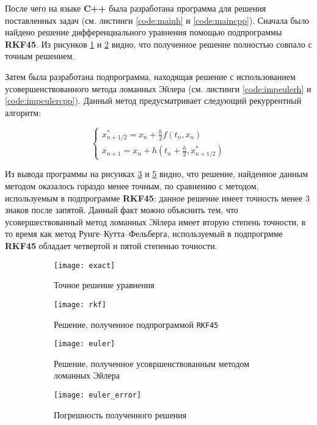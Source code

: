 \vspace{0.25cm}

После чего на языке \textbf{C++} была разработана программа для решения поставленных задач (см. листинги \ref{code:mainh} и \ref{code:maincpp}). Сначала было найдено решение дифференциального уравнения помощью подпрограммы \textbf{RKF45}. Из рисунков \ref{fig:exact} и \ref{fig:rkf} видно, что полученное решение полностью совпало с точным решением.

Затем была разработана подпрограмма, находящая решение с использованием усовершенствованного метода ломанных Эйлера (см. листинги \ref{code:impeulerh} и \ref{code:impeulercpp}). Данный метод предусматривает следующий рекуррентный алгоритм: 

\[
\begin{cases}
	x_{n+1/2}^{*} = x_n + \frac{h}{2} f(t_n, x_n)
	\\
	x_{n+1} = x_n + h \left(t_n + \frac{h}{2}, x_{n+1/2}^{*} \right)
\end{cases}
\]

Из вывода программы на рисунках \ref{fig:euler} и \ref{fig:euler_error} видно, что решение, найденное данным методом оказалось гораздо менее точным, по сравнению с методом, используемым в подпрограмме \textbf{RKF45}: данное решение имеет точность менее 3 знаков после запятой. Данный факт можно объяснить тем, что усовершествованный метод ломанных Эйлера имеет вторую степень точности, в то время как метод Рунге--Кутта--Фельберга, используемый в подпрогрмме \textbf{RKF45} обладает четвертой и пятой степенью точности.

\begin{figure}[H]
\begin{center}
	\begin{subfigure}[t]{0.35\textwidth}
		\texttt{[image: exact]}
		\caption{Точное решение уравнения}
		\label{fig:exact}
	\end{subfigure}
	\begin{subfigure}[t]{0.35\textwidth}
		\texttt{[image: rkf]}
		\caption{Решение, полученное подпрограммой \texttt{RKF45}}
		\label{fig:rkf}
	\end{subfigure}
	\begin{subfigure}[t]{0.35\textwidth}
		\texttt{[image: euler]}
		\caption{Решение, полученное усовршенствованным методом ломанных Эйлера}
		\label{fig:euler}
	\end{subfigure}
	\begin{subfigure}[t]{0.35\textwidth}
		\texttt{[image: euler\_error]}
		\caption{Погрешность полученного решения}
		\label{fig:euler_error}
	\end{subfigure}
	\caption{}
	\vspace{-0.8cm}
\end{center}
\end{figure}


